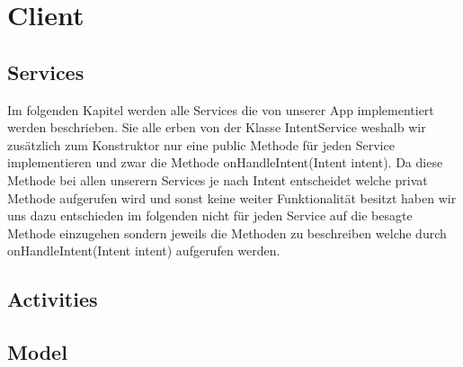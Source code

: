 
\section{Client} 
	\subsection{Services}
	Im folgenden Kapitel werden alle Services die von unserer App implementiert werden beschrieben.
	Sie alle erben von der Klasse IntentService weshalb wir zusätzlich zum Konstruktor nur eine public Methode für jeden Service implementieren und zwar die Methode onHandleIntent(Intent intent).
	Da diese Methode bei allen unserern Services je nach Intent entscheidet welche privat Methode aufgerufen wird und sonst keine weiter Funktionalität besitzt haben wir uns dazu entschieden im folgenden nicht für jeden Service auf die besagte Methode einzugehen sondern jeweils die Methoden zu beschreiben welche durch onHandleIntent(Intent intent) aufgerufen werden. 
	\subsection{Activities}
	\subsection{Model}
	\newpage
